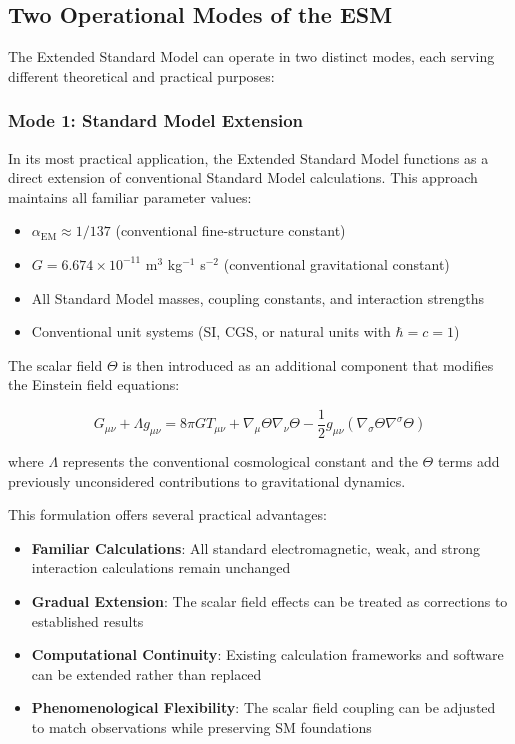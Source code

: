 \documentclass[12pt,a4paper]{article}
\newcommand{\alphaEM}{\alpha_{\text{EM}}}
\begin{document}
	\subsection{Two Operational Modes of the ESM}
	\label{subsec:two_operational_modes}
	
	The Extended Standard Model can operate in two distinct modes, each serving different theoretical and practical purposes:
	
	\subsubsection{Mode 1: Standard Model Extension}
	\label{subsubsec:mode1_sm_extension}
	
	In its most practical application, the Extended Standard Model functions as a direct extension of conventional Standard Model calculations. This approach maintains all familiar parameter values:
	
	\begin{itemize}
		\item $\alphaEM \approx 1/137$ (conventional fine-structure constant) \cite{PDG2020}
		\item $G = 6.674 \times 10^{-11}$ m$^3$ kg$^{-1}$ s$^{-2}$ (conventional gravitational constant)
		\item All Standard Model masses, coupling constants, and interaction strengths
		\item Conventional unit systems (SI, CGS, or natural units with $\hbar = c = 1$)
	\end{itemize}
	
	The scalar field $\Theta$ is then introduced as an additional component that modifies the Einstein field equations:
	
	\begin{equation}
		G_{\mu\nu} + \Lambda g_{\mu\nu} = 8\pi G T_{\mu\nu} + \nabla_{\mu}\Theta\nabla_{\nu}\Theta - \frac{1}{2}g_{\mu\nu}(\nabla_{\sigma}\Theta\nabla^{\sigma}\Theta)
	\end{equation}
	
	where $\Lambda$ represents the conventional cosmological constant and the $\Theta$ terms add previously unconsidered contributions to gravitational dynamics.
	
	This formulation offers several practical advantages:
	
	\begin{itemize}
		\item \textbf{Familiar Calculations}: All standard electromagnetic, weak, and strong interaction calculations remain unchanged
		\item \textbf{Gradual Extension}: The scalar field effects can be treated as corrections to established results
		\item \textbf{Computational Continuity}: Existing calculation frameworks and software can be extended rather than replaced
		\item \textbf{Phenomenological Flexibility}: The scalar field coupling can be adjusted to match observations while preserving SM foundations
	\end{itemize}
	
\end{document}
